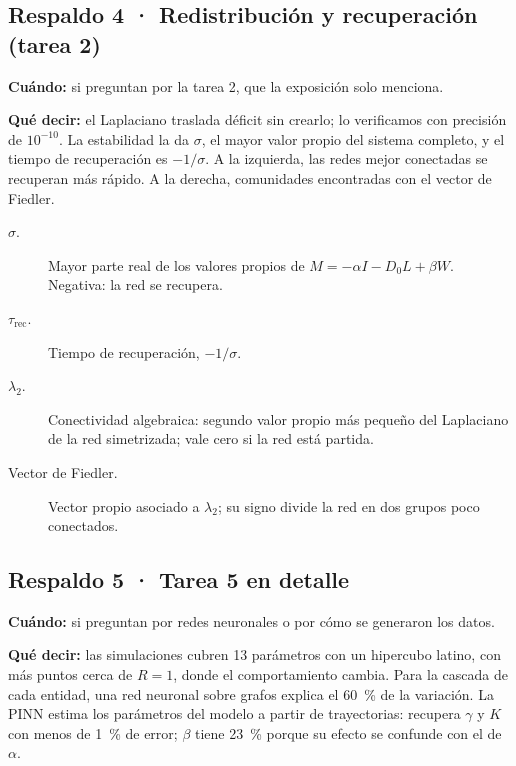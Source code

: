 \subsection*{Respaldo 4 · Redistribución y recuperación (tarea 2)}
\textbf{Cuándo:} si preguntan por la tarea 2, que la exposición solo menciona.

\textbf{Qué decir:} el Laplaciano traslada déficit sin crearlo; lo verificamos con
precisión de $10^{-10}$. La estabilidad la da $\sigma$, el mayor valor propio del sistema
completo, y el tiempo de recuperación es $-1/\sigma$. A la izquierda, las redes mejor
conectadas se recuperan más rápido. A la derecha, comunidades encontradas con el vector de
Fiedler.

\begin{terminos}
\begin{description}
\item[$\sigma$.] Mayor parte real de los valores propios de $M=-\alpha I-D_0L+\beta W$.
Negativa: la red se recupera.
\item[$\tau_\text{rec}$.] Tiempo de recuperación, $-1/\sigma$.
\item[$\lambda_2$.] Conectividad algebraica: segundo valor propio más pequeño del
Laplaciano de la red simetrizada; vale cero si la red está partida.
\item[Vector de Fiedler.] Vector propio asociado a $\lambda_2$; su signo divide la red en
dos grupos poco conectados.
\end{description}
\end{terminos}

\subsection*{Respaldo 5 · Tarea 5 en detalle}
\textbf{Cuándo:} si preguntan por redes neuronales o por cómo se generaron los datos.

\textbf{Qué decir:} las simulaciones cubren 13 parámetros con un hipercubo latino, con
más puntos cerca de $R=1$, donde el comportamiento cambia. Para la cascada de cada
entidad, una red neuronal sobre grafos explica el 60~\% de la variación. La PINN estima
los parámetros del modelo a partir de trayectorias: recupera $\gamma$ y $K$ con menos de
1~\% de error; $\beta$ tiene 23~\% porque su efecto se confunde con el de $\alpha$.

